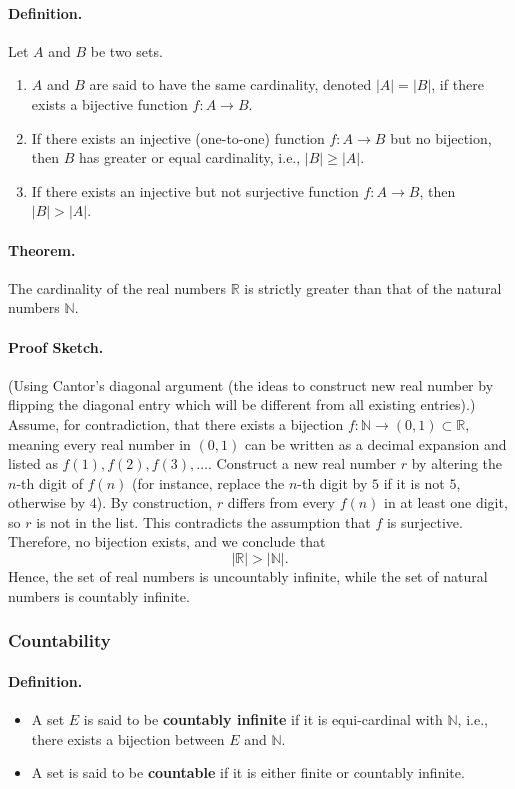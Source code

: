 \paragraph{Definition.}
Let $A$ and $B$ be two sets.
\begin{enumerate}
    \item $A$ and $B$ are said to have the same cardinality, denoted $|A| = |B|$, if there exists a bijective function $f: A \to B$.
    \item If there exists an injective (one-to-one) function $f: A \to B$ but no bijection, then $B$ has greater or equal cardinality, i.e., $|B| \geq |A|$.
    \item If there exists an injective but not surjective function $f: A \to B$, then $|B| > |A|$.
\end{enumerate}

\paragraph{Theorem.}
The cardinality of the real numbers $\mathbb{R}$ is strictly greater than that of the natural numbers $\mathbb{N}$.

\paragraph{Proof Sketch.}
(Using Cantor's diagonal argument (the ideas to construct new real number by flipping the diagonal entry which will be different from all existing entries).)  
Assume, for contradiction, that there exists a bijection $f: \mathbb{N} \to (0,1) \subset \mathbb{R}$, meaning every real number in $(0,1)$ can be written as a decimal expansion and listed as $f(1), f(2), f(3), \dots$.  
Construct a new real number $r$ by altering the $n$-th digit of $f(n)$ (for instance, replace the $n$-th digit by $5$ if it is not $5$, otherwise by $4$). By construction, $r$ differs from every $f(n)$ in at least one digit, so $r$ is not in the list.  
This contradicts the assumption that $f$ is surjective. Therefore, no bijection exists, and we conclude that
\[
|\mathbb{R}| > |\mathbb{N}|.
\]
Hence, the set of real numbers is uncountably infinite, while the set of natural numbers is countably infinite.


\subsubsection{Countability}

\paragraph{Definition.}
\begin{itemize}
    \item A set $E$ is said to be \textbf{countably infinite} if it is equi-cardinal with $\mathbb{N}$, i.e., there exists a bijection between $E$ and $\mathbb{N}$.
    \item A set is said to be \textbf{countable} if it is either finite or countably infinite.
\end{itemize}


